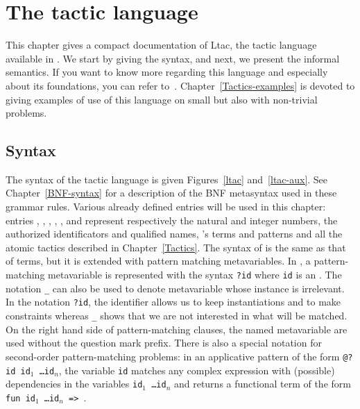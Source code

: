 \chapter[The tactic language]{The tactic language\label{TacticLanguage}}


This chapter gives a compact documentation of Ltac, the tactic
language available in {\Coq}. We start by giving the syntax, and next,
we present the informal semantics. If you want to know more regarding
this language and especially about its foundations, you can refer
to~\cite{Del00}. Chapter~\ref{Tactics-examples} is devoted to giving
examples of use of this language on small but also with non-trivial
problems.


\section{Syntax}

\def\tacexpr{\textrm{\textsl{expr}}}
\def\tacexprlow{\textrm{\textsl{tacexpr$_1$}}}
\def\tacexprinf{\textrm{\textsl{tacexpr$_2$}}}
\def\tacexprpref{\textrm{\textsl{tacexpr$_3$}}}
\def\atom{\textrm{\textsl{atom}}}
\def\letclause{\textrm{\textsl{let\_clause}}}
\def\matchrule{\textrm{\textsl{match\_rule}}}
\def\contextrule{\textrm{\textsl{context\_rule}}}
\def\contexthyp{\textrm{\textsl{context\_hyp}}}
\def\tacarg{\nterm{tacarg}}
\def\cpattern{\nterm{cpattern}}
\def\selector{\textrm{\textsl{selector}}}

The syntax of the tactic language is given Figures~\ref{ltac}
and~\ref{ltac-aux}. See Chapter~\ref{BNF-syntax} for a description of
the BNF metasyntax used in these grammar rules. Various already
defined entries will be used in this chapter: entries
{\naturalnumber}, {\integer}, {\ident}, {\qualid}, {\term},
{\cpattern} and {\atomictac} represent respectively the natural and
integer numbers, the authorized identificators and qualified names,
{\Coq}'s terms and patterns and all the atomic tactics described in
Chapter~\ref{Tactics}. The syntax of {\cpattern} is the same as that
of terms, but it is extended with pattern matching metavariables. In
{\cpattern}, a pattern-matching metavariable is represented with the
syntax {\tt ?id} where {\tt id} is an {\ident}. The notation {\tt \_}
can also be used to denote metavariable whose instance is
irrelevant. In the notation {\tt ?id}, the identifier allows us to
keep instantiations and to make constraints whereas {\tt \_} shows
that we are not interested in what will be matched. On the right hand
side of pattern-matching clauses, the named metavariable are used
without the question mark prefix. There is also a special notation for
second-order pattern-matching problems: in an applicative pattern of
the form {\tt @?id id$_1$ \ldots id$_n$}, the variable {\tt id}
matches any complex expression with (possible) dependencies in the
variables {\tt id$_1$ \ldots id$_n$} and returns a functional term of
the form {\tt fun id$_1$ \ldots id$_n$ => {\term}}.


